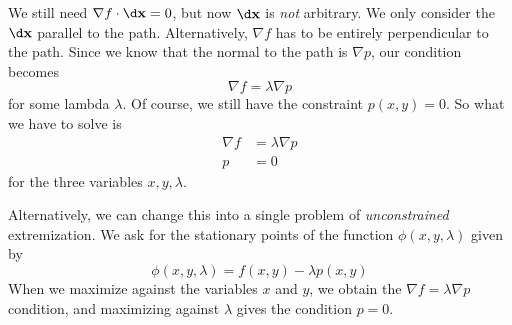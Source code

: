\documentclass[a4paper]{article}
\begin{document}
We still need $\nabla f \cdot \d \mathbf{x} = 0$, but now $\d \mathbf{x}$ is \emph{not} arbitrary. We only consider the $\d \mathbf{x}$ parallel to the path. Alternatively, $\nabla f$ has to be entirely perpendicular to the path. Since we know that the normal to the path is $\nabla p$, our condition becomes
\[
  \nabla f = \lambda \nabla p
\]
for some lambda $\lambda$. Of course, we still have the constraint $p(x, y) = 0$. So what we have to solve is
\begin{align*}
  \nabla f &= \lambda \nabla p\\
  p &= 0
\end{align*}
for the three variables $x, y, \lambda$.

Alternatively, we can change this into a single problem of \emph{unconstrained} extremization. We ask for the stationary points of the function $\phi(x, y, \lambda)$ given by
\[
  \phi(x, y, \lambda) = f(x, y) - \lambda p(x, y)
\]
When we maximize against the variables $x$ and $y$, we obtain the $\nabla f = \lambda \nabla p$ condition, and maximizing against $\lambda$ gives the condition $p = 0$.
\end{document}
